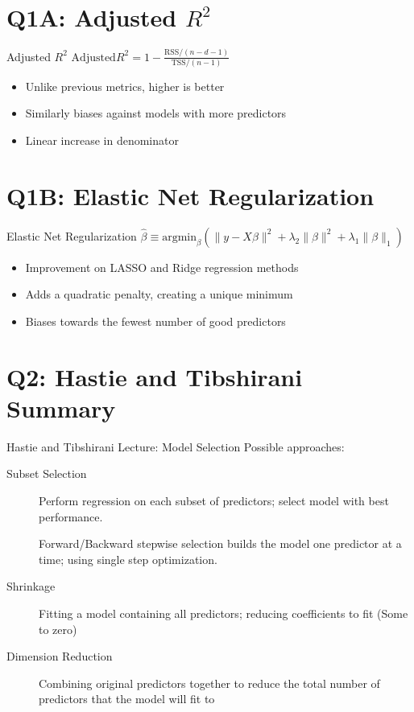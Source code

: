 \documentclass{beamer}
\begin{document}
\section[Q1A]{Q1A: Adjusted $R^2$}
\begin{frame}{Adjusted $R^2$}
	\centering 
	$ \text{Adjusted}R^2 = 1 - \frac{\text{RSS}/(n-d-1)}{\text{TSS}/(n-1)} $
	\vspace{3em}
	\begin{itemize}
		\item Unlike previous metrics, higher is better
		\item Similarly biases against models with more predictors
		\item Linear increase in denominator
	\end{itemize}
\end{frame}

\section[Q1B]{Q1B: Elastic Net Regularization}
\begin{frame}{Elastic Net Regularization}
	\centering 
	$ \hat{\beta} \equiv \text{argmin}_\beta(\|y-X\beta\|^2+\lambda_2\|\beta\|^2 + \lambda_1\|\beta\|_1) $
	\vspace{3em}
	\begin{itemize}
		\item Improvement on LASSO and Ridge regression methods
		\item Adds a quadratic penalty, creating a unique minimum
		\item Biases towards the fewest number of good predictors
	\end{itemize}
\end{frame}

\section[Q2]{Q2: Hastie and Tibshirani Summary}

\begin{frame}{Hastie and Tibshirani Lecture: Model Selection}
	Possible approaches: \vspace{1em}
	\begin{description}
		\item[Subset Selection] Perform regression on each subset of predictors; 
		select model with best performance.
		\item[] Forward/Backward stepwise selection builds the model one predictor at a time; using single step optimization.
		\item[Shrinkage] Fitting a model containing all predictors; reducing coefficients to fit (Some to zero)
		\item[Dimension Reduction] Combining original predictors together to reduce the total number of predictors that the model will fit to
	\end{description}
\end{frame}
\end{document}
